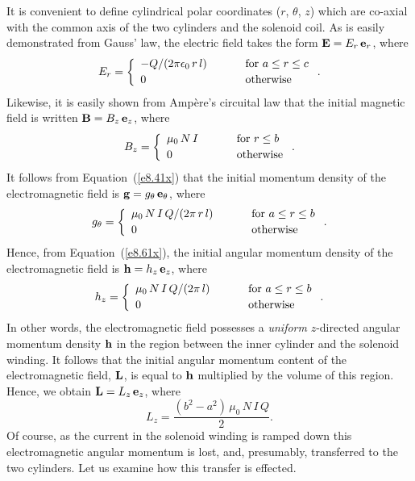It is convenient to define cylindrical polar coordinates ($r$, $\theta$, $z$)
which are co-axial with the common axis of the two cylinders and the solenoid coil.
As is easily demonstrated from Gauss' law, the electric field takes the
form ${\bf E} = E_r\,{\bf e}_r$, where
\begin{equation}
E_r = \left\{
\begin{array}{lcl}
-Q/(2\pi\epsilon_0\,r\,l)&\mbox{\hspace{0.5cm}}&\mbox{for $a\leq r\leq c$}\\[0.5ex]
0&&\mbox{otherwise}
\end{array}
 \right..
\end{equation}
Likewise, it is easily shown from Amp\`{e}re's circuital law
that the initial magnetic field is written ${\bf B} = B_z\,{\bf e}_z$, where
\begin{equation}
B_z = \left\{
\begin{array}{lcl}
\mu_0\,N\,I&\mbox{\hspace{0.5cm}}&\mbox{for $r\leq b$}\\[0.5ex]
0&&\mbox{otherwise}
\end{array}
 \right..
\end{equation}
It follows from Equation~(\ref{e8.41x}) that the initial momentum density
of the electromagnetic field is ${\bf g} = g_\theta\,{\bf e}_\theta$, where
\begin{equation}
g_\theta = \left\{
\begin{array}{lcl}
\mu_0\,N\,I\,Q/(2\pi\,r\,l)&\mbox{\hspace{0.5cm}}&\mbox{for $a \leq r\leq b$}\\[0.5ex]
0&&\mbox{otherwise}
\end{array}
 \right..
\end{equation}
Hence, from Equation~(\ref{e8.61x}), the initial angular momentum density
of the electromagnetic field is ${\bf h} = h_z\,{\bf e}_z$, where
\begin{equation}
h_z = \left\{
\begin{array}{lcl}
\mu_0\,N\,I\,Q/(2\pi\,l)&\mbox{\hspace{0.5cm}}&\mbox{for $a \leq r\leq b$}\\[0.5ex]
0&&\mbox{otherwise}
\end{array}
 \right..
\end{equation}
In other words, the electromagnetic field possesses a {\em uniform}\/ $z$-directed angular momentum density ${\bf h}$ in the region between the
inner cylinder and the solenoid winding. It follows that the initial 
angular momentum content of the electromagnetic field, ${\bf L}$, is equal to ${\bf h}$
multiplied by the volume of this region. Hence, we obtain ${\bf L} = L_z\,{\bf e}_z$, where
\begin{equation}
L_z = \frac{(b^2-a^2)\,\mu_0\,N\,I\,Q}{2}.
\end{equation}
Of course, as the current in the solenoid winding is ramped down this
electromagnetic angular momentum is lost, and, presumably, transferred
to the two cylinders. Let us examine how this transfer is effected.

